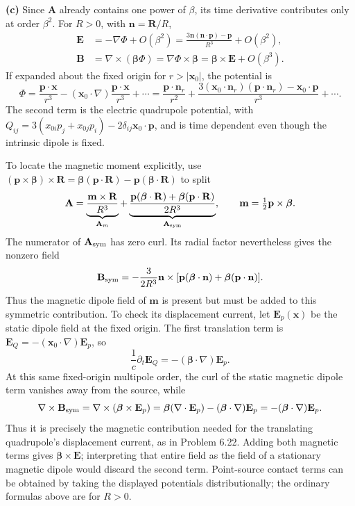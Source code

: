 \textbf{(c)} Since $\mathbf A$ already contains one power of
$\beta$, its time derivative contributes only at order $\beta^2$.
For $R>0$, with $\mathbf n=\mathbf R/R$,
\begin{align*}
\mathbf E&=-\nabla\Phi+O(\beta^2)
=\boxed{\frac{3\mathbf n(\mathbf n\cdot\mathbf p)-\mathbf p}{R^3}
+O(\beta^2)},\\
\mathbf B&=\nabla\times(\boldsymbol\beta\Phi)
=\nabla\Phi\times\boldsymbol\beta
=\boxed{\boldsymbol\beta\times\mathbf E+O(\beta^3)}.
\end{align*}
If expanded about the fixed origin for $r>|\mathbf x_0|$,
the potential is
\[
\Phi=\frac{\mathbf p\cdot\mathbf x}{r^3}
-(\mathbf x_0\cdot\nabla)\frac{\mathbf p\cdot\mathbf x}{r^3}
+\cdots
=\frac{\mathbf p\cdot\mathbf n_r}{r^2}
+\frac{3(\mathbf x_0\cdot\mathbf n_r)(\mathbf p\cdot\mathbf n_r)
-\mathbf x_0\cdot\mathbf p}{r^3}+\cdots.
\]
The second term is the electric quadrupole potential, with
$Q_{ij}=3(x_{0i}p_j+x_{0j}p_i)-2\delta_{ij}\mathbf x_0\cdot\mathbf p$,
and is time dependent even though the intrinsic dipole is fixed.

To locate the magnetic moment explicitly, use
$(\mathbf p\times\boldsymbol\beta)\times\mathbf R
=\boldsymbol\beta(\mathbf p\cdot\mathbf R)
-\mathbf p(\boldsymbol\beta\cdot\mathbf R)$ to split
\[
\mathbf A=\underbrace{\frac{\mathbf m\times\mathbf R}{R^3}}_{\mathbf A_m}
+\underbrace{\frac{\mathbf p(\boldsymbol\beta\cdot\mathbf R)
+\boldsymbol\beta(\mathbf p\cdot\mathbf R)}{2R^3}}_{\mathbf A_{\rm sym}},
\qquad\mathbf m=\tfrac12\mathbf p\times\boldsymbol\beta.
\]
The numerator of $\mathbf A_{\rm sym}$ has zero curl. Its radial
factor nevertheless gives the nonzero field
\[
\mathbf B_{\rm sym}=-\frac{3}{2R^3}\mathbf n\times
[\mathbf p(\boldsymbol\beta\cdot\mathbf n)
+\boldsymbol\beta(\mathbf p\cdot\mathbf n)].
\]
Thus the magnetic dipole field of $\mathbf m$ is present but must
be added to this symmetric contribution. To check its displacement current, let $\mathbf E_p(\mathbf x)$
be the static dipole field at the fixed origin.  The first
translation term is $\mathbf E_Q=-(\mathbf x_0\cdot\nabla)\mathbf E_p$,
so
\[
\frac1c\partial_t\mathbf E_Q
=-(\boldsymbol\beta\cdot\nabla)\mathbf E_p.
\]
At this same fixed-origin multipole order, the curl of the static
magnetic dipole term vanishes away from the source, while
\[
\nabla\times\mathbf B_{\rm sym}
=\nabla\times(\boldsymbol\beta\times\mathbf E_p)
=\boldsymbol\beta(\nabla\cdot\mathbf E_p)
-(\boldsymbol\beta\cdot\nabla)\mathbf E_p
=-(\boldsymbol\beta\cdot\nabla)\mathbf E_p.
\]
Thus it is precisely the magnetic contribution needed for the
translating quadrupole's displacement current, as in Problem 6.22. Adding both magnetic terms gives
$\boldsymbol\beta\times\mathbf E$; interpreting that entire field
as the field of a stationary magnetic dipole would discard the
second term. Point-source contact terms can be obtained by taking
the displayed potentials distributionally; the ordinary formulas
above are for $R>0$.


